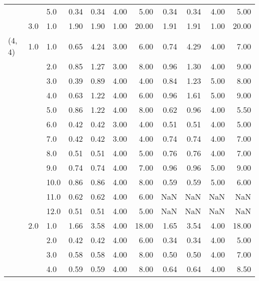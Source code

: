 \begin{tabular}{lllrrrrrrrr}
       &     & 5.0  &       0.34 &      0.34 & 4.00 &   5.00 &       0.34 &      0.34 & 4.00 &   5.00 \\
       & 3.0 & 1.0  &       1.90 &      1.90 & 1.00 &  20.00 &       1.91 &      1.91 & 1.00 &  20.00 \\
(4, 4) & 1.0 & 1.0  &       0.65 &      4.24 & 3.00 &   6.00 &       0.74 &      4.29 & 4.00 &   7.00 \\
       &     & 2.0  &       0.85 &      1.27 & 3.00 &   8.00 &       0.96 &      1.30 & 4.00 &   9.00 \\
       &     & 3.0  &       0.39 &      0.89 & 4.00 &   4.00 &       0.84 &      1.23 & 5.00 &   8.00 \\
       &     & 4.0  &       0.63 &      1.22 & 4.00 &   6.00 &       0.96 &      1.61 & 5.00 &   9.00 \\
       &     & 5.0  &       0.86 &      1.22 & 4.00 &   8.00 &       0.62 &      0.96 & 4.00 &   5.50 \\
       &     & 6.0  &       0.42 &      0.42 & 3.00 &   4.00 &       0.51 &      0.51 & 4.00 &   5.00 \\
       &     & 7.0  &       0.42 &      0.42 & 3.00 &   4.00 &       0.74 &      0.74 & 4.00 &   7.00 \\
       &     & 8.0  &       0.51 &      0.51 & 4.00 &   5.00 &       0.76 &      0.76 & 4.00 &   7.00 \\
       &     & 9.0  &       0.74 &      0.74 & 4.00 &   7.00 &       0.96 &      0.96 & 5.00 &   9.00 \\
       &     & 10.0 &       0.86 &      0.86 & 4.00 &   8.00 &       0.59 &      0.59 & 5.00 &   6.00 \\
       &     & 11.0 &       0.62 &      0.62 & 4.00 &   6.00 &        NaN &       NaN &  NaN &    NaN \\
       &     & 12.0 &       0.51 &      0.51 & 4.00 &   5.00 &        NaN &       NaN &  NaN &    NaN \\
       & 2.0 & 1.0  &       1.66 &      3.58 & 4.00 &  18.00 &       1.65 &      3.54 & 4.00 &  18.00 \\
       &     & 2.0  &       0.42 &      0.42 & 4.00 &   6.00 &       0.34 &      0.34 & 4.00 &   5.00 \\
       &     & 3.0  &       0.58 &      0.58 & 4.00 &   8.00 &       0.50 &      0.50 & 4.00 &   7.00 \\
       &     & 4.0  &       0.59 &      0.59 & 4.00 &   8.00 &       0.64 &      0.64 & 4.00 &   8.50 \\

\end{tabular}
